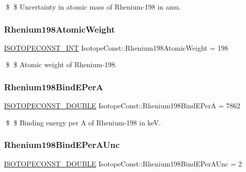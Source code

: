 \$ \$ Uncertainty in atomic mass of Rhenium-\/198 in amu. \mbox{\label{group___isotope_const-_rhenium-_re198_ga85f3f482ecb8e513a97e5c6f3a2c8c0f}} 
\subsubsection{\texorpdfstring{Rhenium198\+Atomic\+Weight}{Rhenium198AtomicWeight}}
{\footnotesize\ttfamily \mbox{\hyperlink{group___isotope_const-_macros_ga5f18360b3e99483a35c32d789e62621c}{I\+S\+O\+T\+O\+P\+E\+C\+O\+N\+S\+T\+\_\+\+I\+NT}} Isotope\+Const\+::\+Rhenium198\+Atomic\+Weight = 198}

\$ \$ Atomic weight of Rhenium-\/198. \mbox{\label{group___isotope_const-_rhenium-_re198_ga2e1805d0931c4deae624243683ccfd0e}} 
\subsubsection{\texorpdfstring{Rhenium198\+Bind\+E\+PerA}{Rhenium198BindEPerA}}
{\footnotesize\ttfamily \mbox{\hyperlink{group___isotope_const-_macros_ga8f45a7272ce02c0b4c65c44636ed719a}{I\+S\+O\+T\+O\+P\+E\+C\+O\+N\+S\+T\+\_\+\+D\+O\+U\+B\+LE}} Isotope\+Const\+::\+Rhenium198\+Bind\+E\+PerA = 7862}

\$ \$ Binding energy per A of Rhenium-\/198 in keV. \mbox{\label{group___isotope_const-_rhenium-_re198_ga7eddc30503d72048efaf8301104644d3}} 
\subsubsection{\texorpdfstring{Rhenium198\+Bind\+E\+Per\+A\+Unc}{Rhenium198BindEPerAUnc}}
{\footnotesize\ttfamily \mbox{\hyperlink{group___isotope_const-_macros_ga8f45a7272ce02c0b4c65c44636ed719a}{I\+S\+O\+T\+O\+P\+E\+C\+O\+N\+S\+T\+\_\+\+D\+O\+U\+B\+LE}} Isotope\+Const\+::\+Rhenium198\+Bind\+E\+Per\+A\+Unc = 2}

